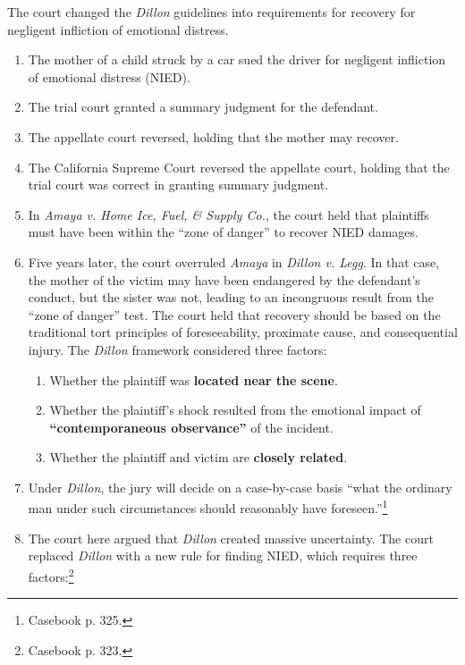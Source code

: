 The court changed the \emph{Dillon} guidelines into requirements for recovery 
for negligent infliction of emotional distress.

\begin{enumerate}
    \item The mother of a child struck by a car sued the driver for negligent 
    infliction of emotional distress (NIED).
    \item The trial court granted a summary judgment for the defendant.
    \item The appellate court reversed, holding that the mother may recover.
    \item The California Supreme Court reversed the appellate court, holding 
    that the trial court was correct in granting summary judgment.
    \item In \emph{Amaya v. Home Ice, Fuel, \& Supply Co.}, the court held 
    that plaintiffs must have been within the ``zone of danger'' to recover 
    NIED damages.
    \item Five years later, the court overruled \emph{Amaya} in \emph{Dillon 
    v. Legg}. In that case, the mother of the victim may have been endangered 
    by the defendant's conduct, but the sister was not, leading to an 
    incongruous result from the ``zone of danger'' test. The court held that 
    recovery should be based on the traditional tort principles of 
    foreseeability, proximate cause, and consequential injury. The 
    \emph{Dillon} framework considered three factors:
    \begin{enumerate}
        \item Whether the plaintiff was \textbf{located near the scene}.
        \item Whether the plaintiff's shock resulted from the emotional impact 
        of \textbf{``contemporaneous observance''} of the incident.
        \item Whether the plaintiff and victim are \textbf{closely related}.
    \end{enumerate}
    \item Under \emph{Dillon}, the jury will decide on a case-by-case basis 
    ``what the ordinary man under such circumstances should reasonably have 
    foreseen.''\footnote{Casebook p. 325.}
    \item The court here argued that \emph{Dillon} created massive 
    uncertainty. The court replaced \emph{Dillon} with a new rule for finding 
    NIED, which requires three factors:\footnote{Casebook p. 323.}
    \begin{enumerate}

\end{enumerate}
\end{enumerate}
